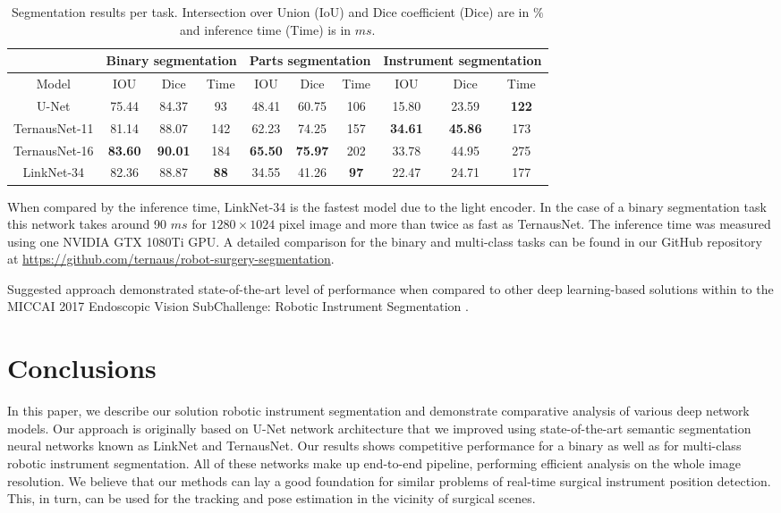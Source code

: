 \documentclass[runningheads,a4paper]{llncs}[2015/06/24]
\begin{document}
\begin{table}[t!]
\caption{Segmentation results per task. Intersection over Union (IoU) and Dice coefficient (Dice) are in $\%$ and inference time (Time) is in $ms$.}
\label{table:segmentation}
\centering   
\begin{tabular}{|c | c | c | c | c | c | c | c | c | c|}
\hline\noalign{\smallskip}
&
\multicolumn{3}{c}{Binary segmentation} &
\multicolumn{3}{|c|}{Parts segmentation} &
\multicolumn{3}{c|}{Instrument segmentation} \\
\hline
Model & IOU & Dice & Time & IOU & Dice & Time & IOU & Dice & Time \\
\hline
U-Net & 75.44 & 84.37 & 93 & 48.41 & 60.75 & 106 & 15.80 & 23.59 & \textbf{122}\\
TernausNet-11 & 81.14 & 88.07 & 142 & 62.23 & 74.25 & 157 & \textbf{34.61} & \textbf{45.86} & 173\\
TernausNet-16 & \textbf{83.60} & \textbf{90.01} & 184 & \textbf{65.50} & \textbf{75.97} & 202 & 33.78 & 44.95 & 275\\
LinkNet-34 & 82.36 & 88.87 & \textbf{88} & 34.55 & 41.26 & \textbf{97} & 22.47 & 24.71 & 177\\

\hline
\end{tabular}
\end{table}

When compared by the inference time, LinkNet-34 is the fastest model due to the light encoder. In the case of a binary segmentation task this network takes around 90 $ms$ for $1280\times1024$ pixel image and more than twice as fast as TernausNet. The inference time was measured using one NVIDIA GTX 1080Ti GPU. A detailed comparison for the binary and multi-class tasks can be found in our GitHub repository at \url{https://github.com/ternaus/robot-surgery-segmentation}.

Suggested approach demonstrated state-of-the-art level of performance when compared to other deep learning-based solutions within to the MICCAI 2017 Endoscopic Vision SubChallenge: Robotic Instrument Segmentation \cite{miccai2017}.

\section{Conclusions}
In this paper, we describe our solution robotic instrument segmentation and demonstrate comparative analysis of various deep network models. Our approach is originally based on U-Net network architecture that we improved using state-of-the-art semantic segmentation neural networks known as LinkNet and TernausNet. Our results shows competitive performance for a binary as well as for multi-class robotic instrument segmentation. All of these networks make up end-to-end pipeline, performing efficient analysis on the whole image resolution. We believe that our methods can lay a good foundation for similar problems of real-time surgical instrument position detection. This, in turn, can be used for the tracking and pose estimation in the vicinity of surgical scenes.    




\end{document}
